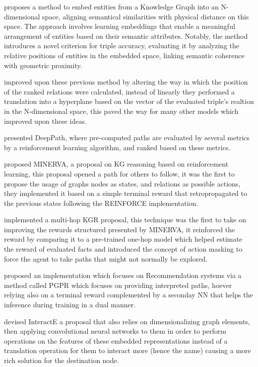\citet{bordes2013translating} proposes a method to embed entities from a Knowledge Graph into an N-dimensional space, aligning semantical similarities with physical distance on this space. The approach involves learning embeddings that enable a meaningful arrangement of entities based on their semantic attributes. Notably, the method introduces a novel criterion for triple accuracy, evaluating it by analyzing the relative positions of entities in the embedded space, linking semantic coherence with geometric proximity.

\citet{wang2014knowledge} improved upon these previous method by altering the way in which the position of the ranked relations were calculated, instead of linearly they performed a translation into a hyperplane based on the vector of the evaluated triple's realtion in the N-dimensional space, this paved the way for many other models which improved upon these ideas.

\citet{xiong2017deeppath} presented DeepPath, where pre-computed paths are evaluated by several metrics by a reinforcement learning algorithm, and ranked based on these metrics.

\citet{das2017go} proposed MINERVA, a proposal on KG reasoning based on reinforcement learning, this proposal opened a path for others to follow, it was the first to propose the usage of graphs nodes as states, and relations as possible actions, they implemented it based on a simple terminal reward that retropropagated to the previous states following the REINFORCE implementation.

\citet{lin2018multi} implemented a multi-hop KGR proposal, this technique was the first to take on improving the rewards structured presented by MINERVA, it reinforced the reward by comparing it to a pre-trained one-hop model which helped estimate the reward of evaluated facts and introduced the concept of action masking to force the agent to take paths that might not normally be explored.

\citet{xian2019reinforcement} proposed an implementation which focuses on Recommendation systems via a method called PGPR which focuses on providing interpreted paths, hoever relying also on a terminal reward complemented by a seconday NN that helps the inference during training in a dual manner.

\citet{vashishth2020interacte} devised InteractE a proposal that also relies on dimensionalizing graph elements, then applying convolutional neural networks to them in order to perform operations on the features of these embedded representations instead of a translation operation for them to interact more (hence the name) causing a more rich solution for the destination node.

